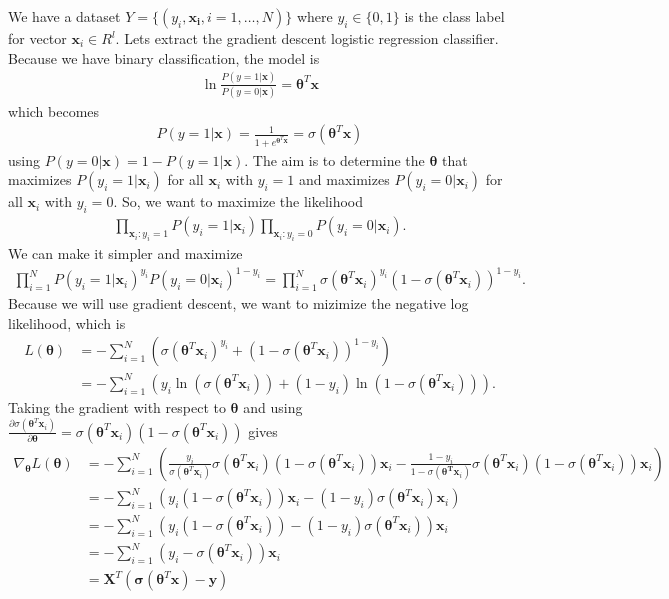 \documentclass[12pt]{book}
\begin{document}
We have a dataset $Y = \{(y_i,\pmb{x_i},i=1,\dots,N)\}$ where $y_i \in \{0,1\}$ is the class label for vector $\pmb{x}_i \in R^l$. Lets extract the gradient descent logistic regression classifier. Because we have binary classification, the model is
\begin{align*}
\ln \frac{P(y=1|\pmb{x})}{P(y=0|\pmb{x})} = \pmb{\theta}^T\pmb{x}
\end{align*}
which becomes
\begin{align*}
P(y=1|\pmb{x}) = \frac{1}{1 + e^{\pmb{\theta}^T\pmb{x}}} = \sigma(\pmb{\theta}^T\pmb{x})
\end{align*}
using $P(y=0|\pmb{x})  = 1 - P(y=1|\pmb{x})$. The aim is to determine the $\pmb{\theta}$ that maximizes $P(y_i=1|\pmb{x}_i)$ for all $\pmb{x}_i$  with $y_i=1$ and maximizes $P(y_i=0|\pmb{x}_i)$ for all $\pmb{x}_i$  with $y_i=0$. So, we want to maximize the likelihood
\begin{align*}
\prod_{\pmb{x}_i:y_i=1}P(y_i=1|\pmb{x}_i)\prod_{\pmb{x}_i:y_i=0}P(y_i=0|\pmb{x}_i).
\end{align*}
We can make it simpler and maximize
\begin{align*}
\prod_{i=1}^{N}P(y_i=1|\pmb{x}_i)^{y_i}P(y_i=0|\pmb{x}_i)^{1-y_i} = \prod_{i=1}^{N}\sigma(\pmb{\theta}^T\pmb{x}_i)^{y_i} (1-\sigma(\pmb{\theta}^T\pmb{x}_i))^{1-y_i}.
\end{align*}
Because we will use gradient descent, we want to mizimize the negative log likelihood, which is
\begin{align*}
L(\pmb{\theta}) &= - \sum_{i=1}^{N}\left( \sigma(\pmb{\theta}^T\pmb{x}_i)^{y_i} + (1-\sigma(\pmb{\theta}^T\pmb{x}_i))^{1-y_i} \right) \\
&= - \sum_{i=1}^{N}\left(y_i \ln ( \sigma(\pmb{\theta}^T\pmb{x}_i)) + (1-y_i)\ln (1-\sigma(\pmb{\theta}^T\pmb{x}_i)) \right).
\end{align*}
Taking the gradient with respect to $\pmb{\theta}$ and using $\frac{\partial \sigma(\pmb{\theta}^T\pmb{x}_i)}{\partial\pmb{ \theta}} = \sigma(\pmb{\theta}^T\pmb{x}_i)(1-\sigma(\pmb{\theta}^T\pmb{x}_i))$ gives
\begin{align*}
\nabla_{\pmb{\theta}}L(\pmb{\theta}) &= - \sum_{i=1}^{N} \left(  \frac{y_i}{\sigma(\pmb{\theta}^T\pmb{x}_i)}\sigma(\pmb{\theta}^T\pmb{x}_i)(1-\sigma(\pmb{\theta}^T\pmb{x}_i)) \pmb{x}_i - 
\frac{1 - y_i}{1 - \sigma(\pmb{\theta^Tx}_i)}\sigma(\pmb{\theta}^T\pmb{x}_i)(1-\sigma(\pmb{\theta}^T\pmb{x}_i)) \pmb{x}_i \right) \\
&= - \sum_{i=1}^{N} \left( y_i (1-\sigma(\pmb{\theta}^T\pmb{x}_i)) \pmb{x}_i - (1-y_i)\sigma(\pmb{\theta}^T\pmb{x}_i) \pmb{x}_i \right) \\
&= - \sum_{i=1}^{N} \left( y_i (1-\sigma(\pmb{\theta}^T\pmb{x}_i)) - (1-y_i)\sigma(\pmb{\theta}^T\pmb{x}_i) \right)\pmb{x}_i \\
&= - \sum_{i=1}^{N} (y_i - \sigma(\pmb{\theta}^T\pmb{x}_i))\pmb{x}_i \\
&= \pmb{X}^T (\pmb{\sigma}(\pmb{\theta}^T\pmb{x})- \pmb{y})
\end{align*}
\end{document}
